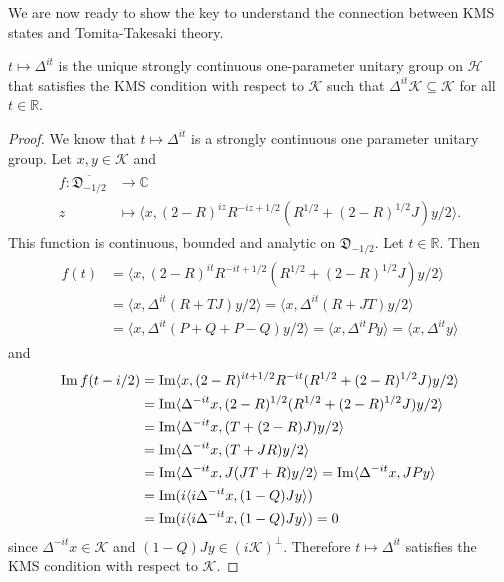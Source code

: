 We are now ready to show the key to understand the connection between KMS states and Tomita-Takesaki theory.

\begin{theorem}\label{thm:KMS_Tomita}
$t\mapsto\Delta^{it}$ is the unique strongly continuous one-parameter unitary group on $\mathcal{H}$ that satisfies the KMS condition with respect to $\mathcal{K}$ such that $\Delta^{it}\mathcal{K}\subseteq\mathcal{K}$ for all $t\in\mathbb{R}$.
\end{theorem}

\begin{proof}
We know that $t\mapsto\Delta^{it}$ is a strongly continuous one parameter unitary group. Let $x,y\in\mathcal{K}$ and 
\begin{align}
\begin{split}
f:\overline{\mathfrak{D}_{-1/2}}&\rightarrow\mathbb{C} \\
z&\mapsto \langle x, (2-R)^{iz}R^{-iz+1/2}(R^{1/2}+(2-R)^{1/2}J)y/2\rangle.
\end{split}
\end{align}
This function is continuous, bounded and analytic on $\mathfrak{D}_{-1/2}$. Let $t\in\mathbb{R}$. Then
\begin{align}
\begin{split}
f(t)&=\langle x, (2-R)^{it}R^{-it+1/2}(R^{1/2}+(2-R)^{1/2}J)y/2\rangle \\
&=\langle x ,\Delta^{it}(R+TJ)y/2\rangle = \langle x, \Delta^{it}(R+JT)y/2\rangle \\
&=\langle x, \Delta^{it}(P+Q+P-Q)y/2\rangle = \langle x, \Delta^{it}Py\rangle = \langle x, \Delta^{it}y\rangle
\end{split}
\end{align}
and 
\begin{align}\label{eq:im}
\begin{split}
\operatorname{Im} f(t-i/2) &= \operatorname{Im} \langle x, (2-R)^{it+1/2}R^{-it}(R^{1/2} + (2-R)^{1/2}J)y/2\rangle \\
&= \operatorname{Im} \langle \Delta^{-it}x, (2-R)^{1/2}(R^{1/2} + (2-R)^{1/2}J)y/2\rangle \\
&= \operatorname{Im} \langle \Delta^{-it}x, (T+(2-R)J)y/2\rangle \\
&= \operatorname{Im}\langle \Delta^{-it}x, (T+JR)y/2\rangle \\
&= \operatorname{Im} \langle \Delta^{-it}x, J(JT+R)y/2\rangle = \operatorname{Im}\langle \Delta^{-it}x, JPy\rangle \\
&= \operatorname{Im} (i\langle i\Delta^{-it}x, (1-Q)Jy\rangle) \\
&= \operatorname{Im} (i\langle i\Delta^{-it}x, (1-Q)Jy\rangle) = 0 
\end{split}
\end{align}
since $\Delta^{-it}x\in\mathcal{K}$ and $(1-Q)Jy\in(i\mathcal{K})^\bot$. Therefore $t\mapsto\Delta^{it}$ satisfies the KMS condition with respect to $\mathcal{K}$.


\end{proof}

